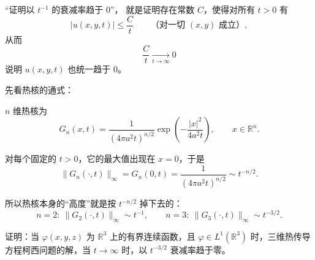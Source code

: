 \begin{dxtips}
    “证明以 $t^{-1}$ 的衰减率趋于 $0$”，
就是证明存在常数 $C$，使得对所有 $t>0$ 有
\[
|u(x,y,t)| \le \frac{C}{t}\qquad\text{（对一切 }(x,y)\text{ 成立）},
\]
从而
\[
\frac{C}{t}\xrightarrow[t\to\infty]{}0
\]
说明 $u(x,y,t)$ 也统一趋于 $0$。

\end{dxtips}
\begin{dxtips}
    先看热核的通式：

$n$ 维热核为
\[
G_n(x,t)
=\frac{1}{(4\pi a^2 t)^{n/2}}
  \exp\!\left(-\frac{|x|^2}{4a^2 t}\right),
\qquad x\in\mathbb R^n.
\]

对每个固定的 $t>0$，它的最大值出现在 $x=0$，于是
\[
\|G_n(\cdot,t)\|_\infty
= G_n(0,t)
= \frac{1}{(4\pi a^2 t)^{n/2}}
\sim t^{-n/2}.
\]

所以热核本身的“高度”就是按 $t^{-n/2}$ 掉下去的：
\[
n=2:\ \|G_2(\cdot,t)\|_\infty \sim t^{-1},\qquad
n=3:\ \|G_3(\cdot,t)\|_\infty \sim t^{-3/2}.
\]
\end{dxtips}
\begin{homework}[3]
证明：当 $\varphi(x,y,z)$ 为 $\mathbb R^3$ 上的有界连续函数，且 $\varphi\in L^1(\mathbb R^3)$ 时，三维热传导方程柯西问题的解，当 $t\to\infty$ 时，以 $t^{-3/2}$ 衰减率趋于零。
\end{homework}
